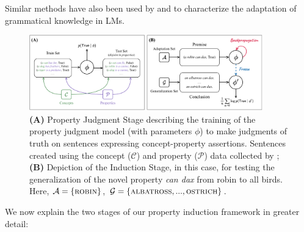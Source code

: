 \documentclass[10pt,letterpaper]{article}
\newcommand{\adaptation}{\mathcal{A}}
\newcommand{\generalization}{\mathcal{G}}
\newcommand{\concepts}{\mathcal{C}}
\newcommand{\properties}{\mathcal{P}}
\begin{document}
{Similar methods have also been used by \citet{van2018neural} and \citet{kim-smolensky-2021-testing} to characterize the adaptation of grammatical knowledge in LMs.}
\begin{figure}[t!]
    \centering
    \includegraphics[width=0.9\textwidth]{propertyinductionframework.pdf}
    \caption{\textbf{(A)} Property Judgment Stage describing the training of the property judgment model (with parameters $\phi$) to make judgments of truth on sentences expressing concept-property assertions. Sentences created using the concept ($\concepts$) and property ($\properties$) data collected by \citet{devereux2014centre}; \textbf{(B)} Depiction of the Induction Stage, in this case, for testing the generalization of the novel property \textit{can dax} from robin to all birds. Here, $\adaptation = \{\textsc{robin}\}$, $\generalization = \{\textsc{albatross}, ..., \textsc{ostrich}\}$.}
    \label{fig:framework}
    \vspace{-1em}
\end{figure}
We now explain the two stages of our property induction framework in greater detail:
\end{document}
